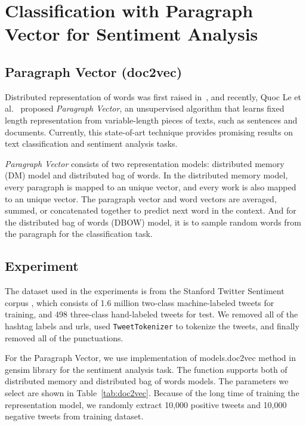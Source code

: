 \section{Classification with Paragraph Vector for Sentiment Analysis}

\subsection{Paragraph Vector (doc2vec)}
Distributed representation of words was first raised in~\cite{rumelhart1988}, and recently, Quoc Le et al.~\cite{le2014} proposed {\textit{Paragraph Vector}}, an unsupervised algorithm that learns fixed length representation from variable-length pieces of texts, such as sentences and documents. Currently, this state-of-art technique provides promising results on text classification and sentiment analysis tasks.

{\textit{Paragraph Vector}} consists of two representation models: distributed memory (DM) model and distributed bag of words. In the distributed memory model, every paragraph is mapped to an unique vector, and every work is also mapped to an unique vector. The paragraph vector and word vectors are averaged, summed, or concatenated together to predict next word in the context. And for the distributed bag of words (DBOW) model, it is to sample random words from the paragraph for the classification task.


\subsection{Experiment}
The dataset used in the experiments is from the Stanford Twitter Sentiment corpus \cite{go2009}, which consists of 1.6 million two-class machine-labeled tweets for training, and 498 three-class hand-labeled tweets for test. We removed all of the hashtag labels and urls, used {\tt TweetTokenizer} to tokenize the tweets, and finally removed all of the punctuations. 

For the Paragraph Vector, we use implementation of models.doc2vec method in gensim library for the sentiment analysis task. The function supports both of distributed memory and distributed bag of words models. The parameters we select are shown in Table~\ref{tab:doc2vec}. Because of the long time of training the representation model, we randomly extract 10,000 positive tweets and 10,000 negative tweets from training dataset.

